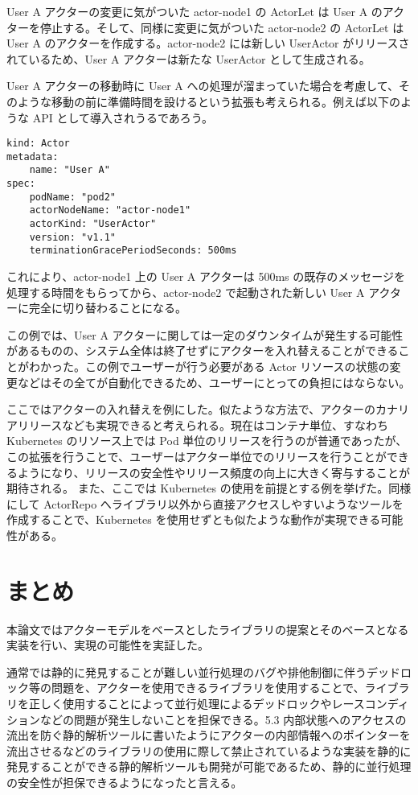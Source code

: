 User A アクターの変更に気がついた actor-node1 の ActorLet は User A
のアクターを停止する。そして、同様に変更に気がついた actor-node2 の
ActorLet は User A のアクターを作成する。actor-node2 には新しい
UserActor がリリースされているため、User A アクターは新たな UserActor
として生成される。

User A アクターの移動時に User A
への処理が溜まっていた場合を考慮して、そのような移動の前に準備時間を設けるという拡張も考えられる。例えば以下のような
API として導入されうるであろう。

\begin{verbatim}
kind: Actor
metadata:
    name: "User A"
spec:
    podName: "pod2"
    actorNodeName: "actor-node1"
    actorKind: "UserActor"
    version: "v1.1"
    terminationGracePeriodSeconds: 500ms
\end{verbatim}

これにより、actor-node1 上の User A アクターは 500ms
の既存のメッセージを処理する時間をもらってから、actor-node2
で起動された新しい User A アクターに完全に切り替わることになる。

この例では、User A
アクターに関しては一定のダウンタイムが発生する可能性があるものの、システム全体は終了せずにアクターを入れ替えることができることがわかった。この例でユーザーが行う必要がある
Actor
リソースの状態の変更などはその全てが自動化できるため、ユーザーにとっての負担にはならない。

ここではアクターの入れ替えを例にした。似たような方法で、アクターのカナリアリリースなども実現できると考えられる。現在はコンテナ単位、すなわち
Kubernetes のリソース上では Pod
単位のリリースを行うのが普通であったが、この拡張を行うことで、ユーザーはアクター単位でのリリースを行うことができるようになり、リリースの安全性やリリース頻度の向上に大きく寄与することが期待される。
また、ここでは Kubernetes の使用を前提とする例を挙げた。同様にして
ActorRepo
へライブラリ以外から直接アクセスしやすいようなツールを作成することで、Kubernetes
を使用せずとも似たような動作が実現できる可能性がある。

\section{まとめ}

本論文ではアクターモデルをベースとしたライブラリの提案とそのベースとなる実装を行い、実現の可能性を実証した。

通常では静的に発見することが難しい並行処理のバグや排他制御に伴うデッドロック等の問題を、アクターを使用できるライブラリを使用することで、ライブラリを正しく使用することによって並行処理によるデッドロックやレースコンディションなどの問題が発生しないことを担保できる。5.3
内部状態へのアクセスの流出を防ぐ静的解析ツールに書いたようにアクターの内部情報へのポインターを流出させるなどのライブラリの使用に際して禁止されているような実装を静的に発見することができる静的解析ツールも開発が可能であるため、静的に並行処理の安全性が担保できるようになったと言える。

